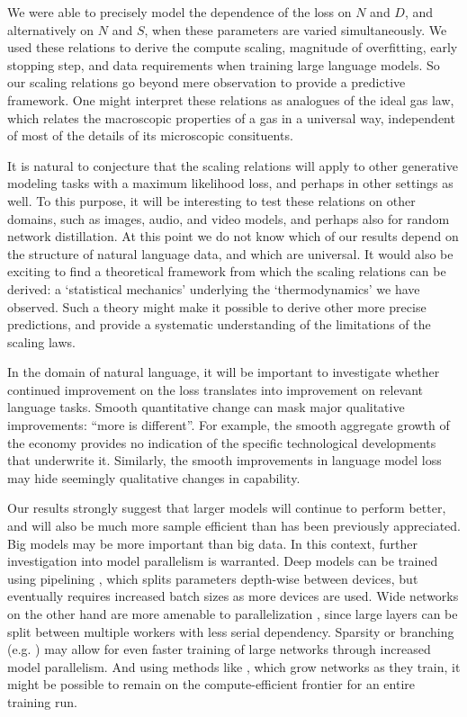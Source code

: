 We were able to precisely model the dependence of the loss on $N$ and $D$, and alternatively on $N$ and $S$, when these parameters are varied simultaneously.  We used these relations to derive the compute scaling, magnitude of overfitting, early stopping step, and data requirements when training large language models. So our scaling relations go beyond mere observation to provide a predictive framework.  One might interpret these relations as analogues of the ideal gas law, which relates the macroscopic properties of a gas in a universal way, independent of most of the details of its microscopic consituents.

It is natural to conjecture that the scaling relations will apply to other generative modeling tasks with a maximum likelihood loss, and perhaps in other settings as well.    To this purpose, it will be  interesting to test these relations on other domains, such as images, audio, and video models, and perhaps also for random network distillation.  At this point we do not know which of our results depend on the structure of natural language data, and which are universal.  It would also be exciting to find a theoretical framework from which the scaling relations can be derived: a `statistical mechanics' underlying the `thermodynamics' we have observed.  Such a theory might make it possible to derive other more precise predictions, and provide a systematic understanding of the limitations of the scaling laws.

In the domain of natural language, it will be important to investigate whether continued improvement on the loss translates into improvement on relevant language tasks.  Smooth quantitative change can mask major qualitative improvements: ``more is different''.  For example, the smooth aggregate growth of the economy provides no indication of the specific technological developments that underwrite it. Similarly, the smooth improvements in language model loss may hide seemingly qualitative changes in capability.

Our results strongly suggest that larger models will continue to perform better, and will also be much more sample efficient than has been previously appreciated.  Big models may be more important than big data.  In this context, further investigation into model parallelism is warranted. Deep models can be trained using pipelining \cite{DBLP:journals/corr/abs-1811-06965}, which splits parameters depth-wise between devices, but eventually requires increased batch sizes as more devices are used.  Wide networks on the other hand are more amenable to parallelization \cite{shazeer2018meshtensorflow}, since large layers can be split between multiple workers with less serial dependency.  Sparsity \cite{DBLP:journals/corr/abs-1904-10509,gray2017gpu} or branching (e.g. \cite{Krizhevsky:2012:ICD:2999134.2999257}) may allow for even faster training of large networks through increased model parallelism.  And using methods like \cite{Wang_2017,wen2019autogrow}, which grow networks as they train, it might be possible to remain on the compute-efficient frontier for an entire training run.


